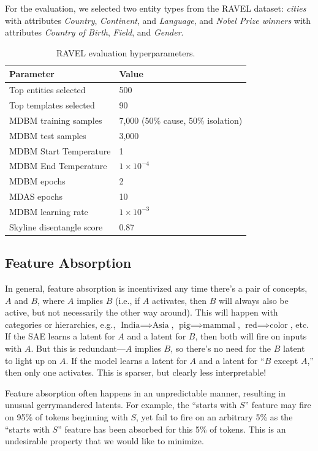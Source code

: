 \documentclass{article}
\theoremstyle{plain}
\theoremstyle{definition}
\theoremstyle{remark}
\begin{document}
For the evaluation, we selected two entity types from the RAVEL dataset: \textit{cities} with attributes \textit{Country}, \textit{Continent}, and \textit{Language}, and \textit{Nobel Prize winners} with attributes \textit{Country of Birth}, \textit{Field}, and \textit{Gender}.

\begin{table}[h!]
\centering
\begin{tabular}{|l|l|}
\hline
\textbf{Parameter} & \textbf{Value} \\ \hline
Top entities selected & 500 \\ \hline
Top templates selected & 90 \\ \hline
MDBM training samples & 7,000 (50\% cause, 50\% isolation) \\ \hline
MDBM test samples & 3,000 \\ \hline
MDBM Start Temperature & 1 \\ \hline
MDBM End Temperature & $1 \times 10^{-4}$ \\ \hline
MDBM epochs & 2 \\ \hline
MDAS epochs & 10 \\ \hline
MDBM learning rate & $1 \times 10^{-3}$ \\ \hline
Skyline disentangle score & 0.87 \\ \hline
\end{tabular}
\caption{RAVEL evaluation hyperparameters.}
\label{tab:ravel-parameters}
\end{table}

\subsection*{Feature Absorption}

In general, feature absorption is incentivized any time there's a pair of concepts, $A$ and $B$, where $A$ implies $B$ (i.e., if $A$ activates, then $B$ will always also be active, but not necessarily the other way around). This will happen with categories or hierarchies, e.g., $\text{India} \implies \text{Asia}$, $\text{pig} \implies \text{mammal}$, $\text{red} \implies \text{color}$, etc. If the SAE learns a latent for $A$ and a latent for $B$, then both will fire on inputs with $A$. But this is redundant—$A$ implies $B$, so there's no need for the $B$ latent to light up on $A$. If the model learns a latent for $A$ and a latent for ``$B$ except $A$,'' then only one activates. This is sparser, but clearly less interpretable!

Feature absorption often happens in an unpredictable manner, resulting in unusual gerrymandered latents. For example, the “starts with $S$” feature may fire on 95\% of tokens beginning with $S$, yet fail to fire on an arbitrary 5\% as the “starts with $S$” feature has been absorbed for this 5\% of tokens. This is an undesirable property that we would like to minimize.
\end{document}
